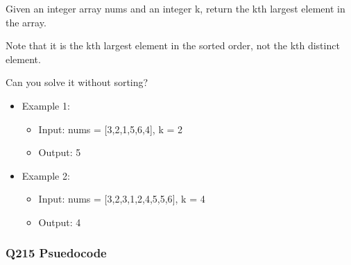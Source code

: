 \documentclass[11pt]{article}
\providecommand{\tightlist}{%
      \setlength{\itemsep}{0pt}\setlength{\parskip}{0pt}}
\begin{document}
Given an integer array nums and an integer k, return the kth largest
element in the array.

Note that it is the kth largest element in the sorted order, not the kth
distinct element.

Can you solve it without sorting?

\begin{itemize}
\tightlist
\item
  Example 1:

  \begin{itemize}
  \tightlist
  \item
    Input: nums = {[}3,2,1,5,6,4{]}, k = 2
  \item
    Output: 5
  \end{itemize}
\item
  Example 2:

  \begin{itemize}
  \tightlist
  \item
    Input: nums = {[}3,2,3,1,2,4,5,5,6{]}, k = 4
  \item
    Output: 4
  \end{itemize}
\end{itemize}

    \subsubsection{Q215 Psuedocode}\label{q215-psuedocode}
\end{document}
